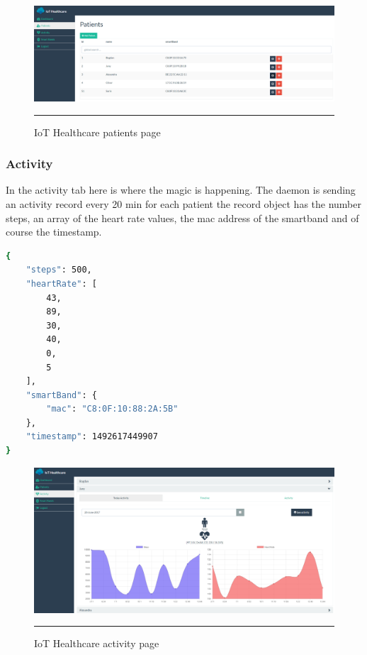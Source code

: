 \begin{figure}[h!]
	\centering
	\includegraphics[width=1\textwidth]{./images/iothpatient}
	\rule{1\textwidth}{1pt}
	\caption{IoT Healthcare patients page}
\end{figure}

\subsubsection{Activity}
In the activity tab here is where the magic is happening. The daemon is sending an activity record every 20 min for each patient the record object has the number steps, an array of the heart rate values, the mac address of the smartband and of course the timestamp. 
\begin{lstlisting}[language=Bash] 
{
	"steps": 500,
	"heartRate": [
		43,
		89,
		30,
		40,
		0,
		5
	],
	"smartBand": {
		"mac": "C8:0F:10:88:2A:5B"
	},
	"timestamp": 1492617449907   
}
\end{lstlisting}      

\begin{figure}[h!]
	\centering
	\includegraphics[width=1\textwidth]{./images/iothactivity}
	\rule{1\textwidth}{1pt}
	\caption{IoT Healthcare activity page}
\end{figure}
